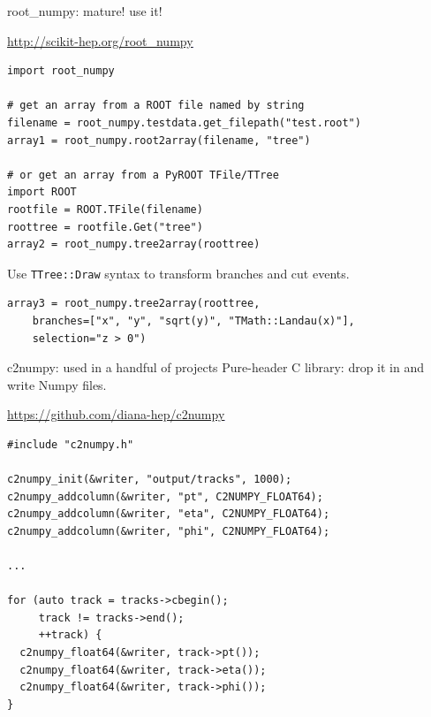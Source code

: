 \documentclass{beamer}
\begin{document}
\begin{frame}[fragile]{root\_numpy: mature! use it!}
\begin{center}
\textcolor{blue}{\underline{\url{http://scikit-hep.org/root_numpy}}}
\end{center}

\footnotesize
\begin{verbatim}
import root_numpy

# get an array from a ROOT file named by string
filename = root_numpy.testdata.get_filepath("test.root")
array1 = root_numpy.root2array(filename, "tree")

# or get an array from a PyROOT TFile/TTree
import ROOT
rootfile = ROOT.TFile(filename)
roottree = rootfile.Get("tree")
array2 = root_numpy.tree2array(roottree)
\end{verbatim}

\vspace{0.5 cm}
{\normalsize Use {\tt TTree::Draw} syntax to transform branches and cut events.}

\begin{verbatim}
array3 = root_numpy.tree2array(roottree,
    branches=["x", "y", "sqrt(y)", "TMath::Landau(x)"],
    selection="z > 0")
\end{verbatim}
\end{frame}

\begin{frame}[fragile]{c2numpy: used in a handful of projects}
\vspace{0.5 cm}
Pure-header C library: drop it in and write Numpy files.

\begin{center}
\textcolor{blue}{\underline{\url{https://github.com/diana-hep/c2numpy}}}
\end{center}

\scriptsize
\begin{verbatim}
#include "c2numpy.h"

c2numpy_init(&writer, "output/tracks", 1000);
c2numpy_addcolumn(&writer, "pt", C2NUMPY_FLOAT64);
c2numpy_addcolumn(&writer, "eta", C2NUMPY_FLOAT64);
c2numpy_addcolumn(&writer, "phi", C2NUMPY_FLOAT64);

...

for (auto track = tracks->cbegin();
     track != tracks->end();
     ++track) {
  c2numpy_float64(&writer, track->pt());
  c2numpy_float64(&writer, track->eta());
  c2numpy_float64(&writer, track->phi());
}
\end{verbatim}
\end{frame}
\end{document}
